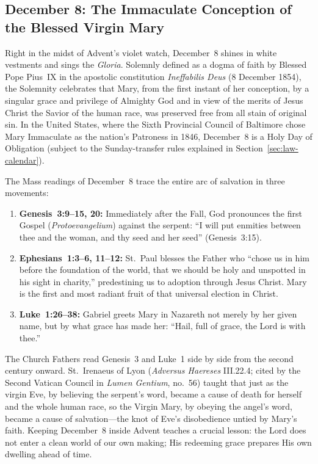 \subsection{December 8: The Immaculate Conception of the Blessed Virgin Mary}

Right in the midst of Advent's violet watch, December~8 shines in white vestments and sings the \textit{Gloria}. Solemnly defined as a dogma of faith by Blessed Pope Pius~IX in the apostolic constitution \textit{Ineffabilis Deus} (8 December 1854), the Solemnity celebrates that Mary, from the first instant of her conception, by a singular grace and privilege of Almighty God and in view of the merits of Jesus Christ the Savior of the human race, was preserved free from all stain of original sin. In the United States, where the Sixth Provincial Council of Baltimore chose Mary Immaculate as the nation's Patroness in 1846, December~8 is a Holy Day of Obligation (subject to the Sunday-transfer rules explained in Section~\ref{sec:law-calendar}).

The Mass readings of December~8 trace the entire arc of salvation in three movements:

\begin{enumerate}
  \item \textbf{Genesis~3:9--15, 20:} Immediately after the Fall, God pronounces the first Gospel (\textit{Protoevangelium}) against the serpent: ``I will put enmities between thee and the woman, and thy seed and her seed'' (Genesis~3:15).
  \item \textbf{Ephesians~1:3--6, 11--12:} St.~Paul blesses the Father who ``chose us in him before the foundation of the world, that we should be holy and unspotted in his sight in charity,'' predestining us to adoption through Jesus Christ. Mary is the first and most radiant fruit of that universal election in Christ.
  \item \textbf{Luke~1:26--38:} Gabriel greets Mary in Nazareth not merely by her given name, but by what grace has made her: ``Hail, full of grace, the Lord is with thee.''
\end{enumerate}

The Church Fathers read Genesis~3 and Luke~1 side by side from the second century onward. St.~Irenaeus of Lyon (\textit{Adversus Haereses} III.22.4; cited by the Second Vatican Council in \textit{Lumen Gentium}, no.~56) taught that just as the virgin Eve, by believing the serpent's word, became a cause of death for herself and the whole human race, so the Virgin Mary, by obeying the angel's word, became a cause of salvation---the knot of Eve's disobedience untied by Mary's faith. Keeping December~8 inside Advent teaches a crucial lesson: the Lord does not enter a clean world of our own making; His redeeming grace prepares His own dwelling ahead of time.

